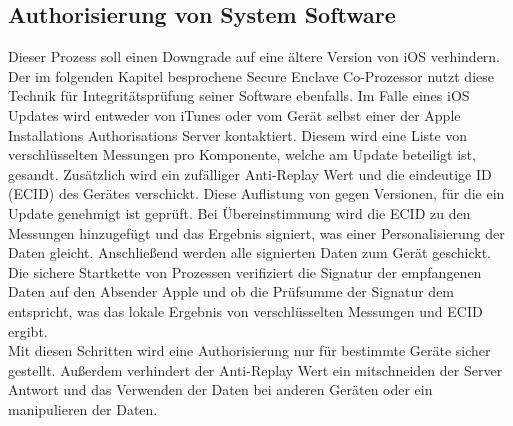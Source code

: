 		
	\subsection{Authorisierung von System Software}
		Dieser Prozess soll einen Downgrade auf eine ältere Version von iOS
		verhindern. Der im folgenden Kapitel besprochene Secure Enclave Co-Prozessor
		nutzt diese Technik für Integritätsprüfung seiner Software ebenfalls. Im Falle
		eines iOS Updates wird entweder von iTunes oder vom Gerät selbst einer der
		Apple Installations Authorisations Server kontaktiert. Diesem wird eine Liste
		von verschlüsselten Messungen pro Komponente, welche am Update
		beteiligt ist, gesandt. Zusätzlich wird ein	zufälliger Anti-Replay Wert und
		die eindeutige ID (ECID) des Gerätes verschickt. Diese Auflistung von gegen
		Versionen, für die ein Update genehmigt ist geprüft. Bei Übereinstimmung wird
		die ECID zu den Messungen hinzugefügt und das Ergebnis signiert, was einer
		Personalisierung der Daten gleicht.	Anschließend werden alle signierten Daten
		zum Gerät geschickt. Die sichere Startkette von Prozessen verifiziert die
		Signatur der empfangenen Daten auf den Absender Apple und ob die Prüfsumme der
		Signatur dem entspricht, was das lokale Ergebnis von verschlüsselten Messungen
		und ECID ergibt.\\
		Mit diesen Schritten wird eine Authorisierung nur für bestimmte Geräte sicher
		gestellt. Außerdem verhindert der Anti-Replay Wert ein mitschneiden der Server
		Antwort und das Verwenden der Daten bei anderen Geräten oder ein manipulieren
		der Daten.
